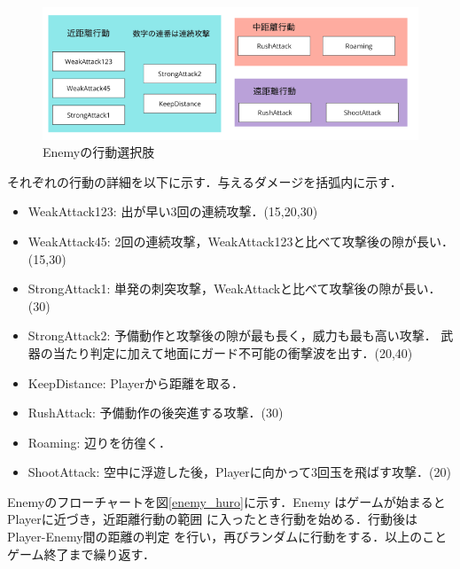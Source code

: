 \documentclass[a4paper,12pt,oneside,openany,titlepage]{jreport}
\begin{document}
 \begin{figure}[h]
   \begin{center}
     \includegraphics[width=11.5cm]{action_choice_E.png}
     \caption{Enemyの行動選択肢}
     \label{action_choice}
   \end{center}
 \end{figure}
 それぞれの行動の詳細を以下に示す．与えるダメージを括弧内に示す．
 {
  \begin{itemize}[itemsep=1pt, leftmargin=27pt, labelsep=5pt, parsep=0pt]
    \item WeakAttack123: 出が早い3回の連続攻撃．(15,20,30)
    \item WeakAttack45: 2回の連続攻撃，WeakAttack123と比べて攻撃後の隙が長い．(15,30)
    \item StrongAttack1: 単発の刺突攻撃，WeakAttackと比べて攻撃後の隙が長い．(30)
    \item StrongAttack2: 予備動作と攻撃後の隙が最も長く，威力も最も高い攻撃．
          武器の当たり判定に加えて地面にガード不可能の衝撃波を出す．(20,40)
    \item KeepDistance: Playerから距離を取る．
    \item RushAttack: 予備動作の後突進する攻撃．(30)
    \item Roaming: 辺りを彷徨く．
    \item ShootAttack: 空中に浮遊した後，Playerに向かって3回玉を飛ばす攻撃．(20)
  \end{itemize}
  }

 
 Enemyのフローチャートを図\ref{enemy_huro}に示す．Enemy
 はゲームが始まるとPlayerに近づき，近距離行動の範囲
 に入ったとき行動を始める．行動後はPlayer-Enemy間の距離の判定
 を行い，再びランダムに行動をする．以上のことゲーム終了まで繰り返す．
 
\end{document}
